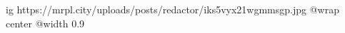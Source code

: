  
 
 
 
 

\ifcmt
  ig https://mrpl.city/uploads/posts/redactor/iks5vyx21wgmmsgp.jpg
  @wrap center
  @width 0.9
\fi
